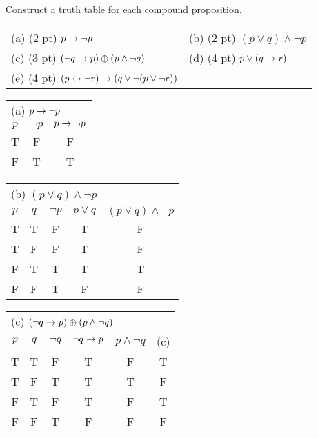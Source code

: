 \begin{questions}
 Construct a truth table for each compound proposition.
    \ifprintanswers
        \vspace{-10pt}
    \fi
    \begin{center}
    \begin{tabular}{ll}
       (a) (2 pt) $p \rightarrow \neg p$  
       & (b) (2 pt) $(p \vee q) \wedge \neg p$ \\
       (c) (3 pt) $(\neg q \rightarrow p) \oplus (p \wedge \neg q)$ 
       & (d) (4 pt) $p \vee (q \rightarrow r)$ \\
       (e) (4 pt) $(p \leftrightarrow \neg r) \rightarrow (q \vee \neg (p \vee \neg r))$
    \end{tabular}
    \end{center}
    \ifprintanswers
        \vspace{-15pt}
    \fi
    \begin{solution}
    \scriptsize
       \begin{tabular}{c|c||c}
            \multicolumn{3}{l}{ (a) $p \rightarrow \neg p$} \\
            $p$ & $\neg p$ & $p \rightarrow \neg p$ \\
         \hline
            T & F & F \\
            F & T & T \\
         \end{tabular} \hspace{0.35in}

        \begin{tabular}{c|c|c||c|c}
            \multicolumn{5}{l}{ (b)  $(p \vee q) \wedge \neg p$} \\
            $p$ & $q$ & $\neg p$ & $p \vee q$ & $(p \vee q) \wedge \neg p$ \\
         \hline
            T & T & F & T & F  \\
            T & F & F & T & F  \\
            F & T & T & T & T  \\
            F & F & T & F & F  \\
        \end{tabular} \hspace{0.35in}

        \begin{tabular}{c|c|c||c|c|c} 
            \multicolumn{6}{l}{(c) $(\neg q \rightarrow p) \oplus (p \wedge \neg q)$ } \\
            $p$ & $q$ & $\neg q$ & $\neg q \rightarrow p$ & $p \wedge \neg q$ & (c)  \\
         \hline
            T & T & F & T & F  & T   \\
            T & F & T & T & T  & F  \\
            F & T & F & T & F  & T  \\
            F & F & T & F & F  & F  \\
        \end{tabular} 


\end{solution}
\end{questions}
